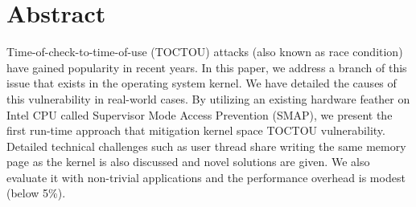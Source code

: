 \section{Abstract}

Time-of-check-to-time-of-use (TOCTOU) attacks (also known as race condition) have gained popularity in recent years. In this paper, we address a branch of this issue that exists in the operating system kernel. We have detailed the causes of this vulnerability in real-world cases. By utilizing an existing hardware feather on Intel CPU called Supervisor Mode Access Prevention (SMAP),  we present the first run-time approach that mitigation kernel space TOCTOU vulnerability. Detailed technical challenges such as user thread share writing the same memory page as the kernel is also discussed and novel solutions are given. We also evaluate it with non-trivial applications and the performance overhead is modest (below 5\%).  


